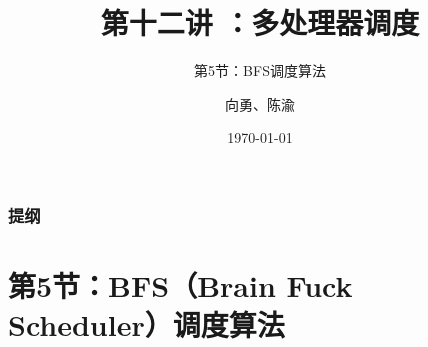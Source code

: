 


\title[第1讲]{第十二讲 ：多处理器调度} %
\subtitle{第5节：BFS调度算法}
\author{向勇、陈渝} %
\date{\today} %




\begin{frame}
\titlepage %
\end{frame}

\begin{frame}
\frametitle{提纲} %
\tableofcontents %
\end{frame}
\section{第5节：BFS（Brain Fuck Scheduler）调度算法} %
